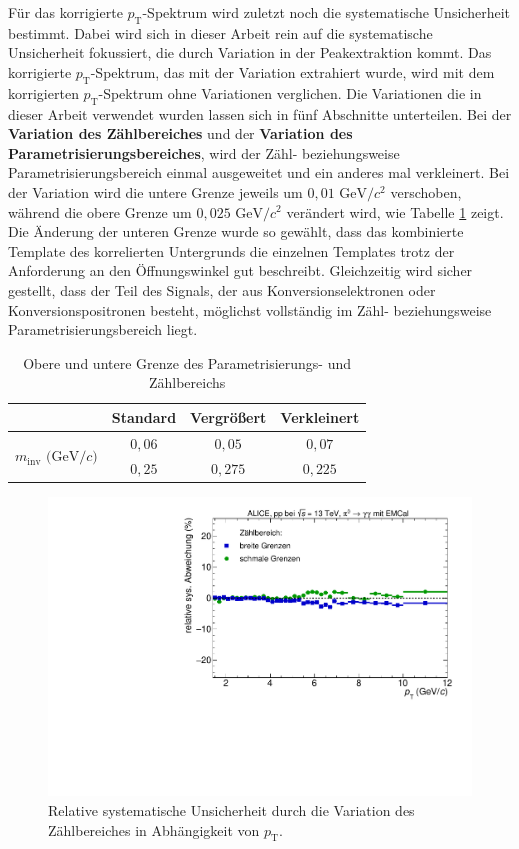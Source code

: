 Für das korrigierte $p_\text{T}$-Spektrum wird zuletzt noch die systematische Unsicherheit bestimmt.
Dabei wird sich in dieser Arbeit rein auf die systematische Unsicherheit fokussiert, die durch Variation in der Peakextraktion kommt.
Das korrigierte $p_\text{T}$-Spektrum, das mit der Variation extrahiert wurde, wird mit dem korrigierten $p_\text{T}$-Spektrum ohne Variationen verglichen.
Die Variationen die in dieser Arbeit verwendet wurden lassen sich in fünf Abschnitte unterteilen.
\newline
Bei der \textbf{Variation des Zählbereiches} und der \textbf{Variation des Parametrisierungsbereiches}, wird der Zähl- beziehungsweise Parametrisierungsbereich einmal ausgeweitet und ein anderes mal verkleinert.
Bei der Variation wird die untere Grenze jeweils um $0,01 \text{ GeV}/c^{2}$ verschoben, während die obere Grenze um $0,025 \text{ GeV}/c^{2}$ verändert wird, wie Tabelle \ref{tab:ParamAndIntRange} zeigt.
Die Änderung der unteren Grenze wurde so gewählt, dass das kombinierte Template des korrelierten Untergrunds die einzelnen Templates trotz der Anforderung an den Öffnungswinkel gut beschreibt.
Gleichzeitig wird sicher gestellt, dass der Teil des Signals, der aus Konversionselektronen oder Konversionspositronen besteht, möglichst vollständig im Zähl- beziehungsweise Parametrisierungsbereich liegt.
\begin{table}[b!]
\centering
\begin{tabular}{c|c||c||c|}
\cline{2-4}
                                                                      & Standard & Vergr{\"o}{\ss}ert & Verkleinert \\ \hline
\multicolumn{1}{|c|}{\multirow{2}{*}{$m_\text{inv}\text{ (GeV}/c)$}} & $0,06$   & $0,05$             & $0,07$      \\ \cline{2-4} 
\multicolumn{1}{|c|}{}                                                & $0,25$   & $0,275$            & $0,225$     \\ \hline
\end{tabular}
\caption{Obere und untere Grenze des Parametrisierungs- und Zählbereichs}
\label{tab:ParamAndIntRange}
\end{table}
\begin{figure}[t]
\centering
\includegraphics[width=.65\linewidth]{YieldsSysUncerIntRange_Data_2016.pdf}
\caption{Relative systematische Unsicherheit durch die Variation des Zählbereiches in Abhängigkeit von $p_\text{T}$.}
\label{fig:IntSys}
\end{figure}
